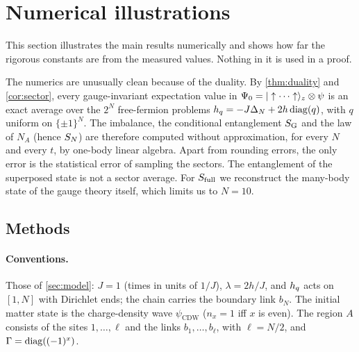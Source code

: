 \providecommand{\Ibar}{\bar I}
\providecommand{\Sfm}{S_{f}}
\providecommand{\Hsh}{\mathrm{H}}
\providecommand{\bent}{\mathsf{h}}
\providecommand{\Mom}{\mathcal{M}}
\providecommand{\Femp}{F_{\mathrm{emp}}}
\providecommand{\kaphat}{\hat\kappa}
\providecommand{\psicdw}{\psi_{\mathrm{CDW}}}

\section{Numerical illustrations}\label{sec:numerics}

This section illustrates the main results numerically and shows how far the rigorous constants are
from the measured values.  Nothing in it is used in a proof.

The numerics are unusually clean because of the duality.  By \cref{thm:duality} and \cref{cor:sector},
every gauge-invariant expectation value in $\Psi_0=|\uparrow\cdots\uparrow\rangle_z\otimes\psi$ is an exact
average over the $2^N$ free-fermion problems $h_{q}=-J\Delta_N+2h\operatorname{diag}(q)$, with $q$ uniform on $\{\pm1\}^N$.
The imbalance, the conditional entanglement $S_{\mathrm{G}}$ and the law of $N_A$ (hence $S_{N}$) are therefore computed without
approximation, for every $N$ and every $t$, by one-body linear algebra.  Apart from rounding errors, the only error is the
statistical error of sampling the sectors.  The entanglement of the superposed state is not a sector average.  For $S_{\mathrm{full}}$ we reconstruct the many-body state of the gauge
theory itself, which limits us to $N=10$.

\subsection{Methods}\label{sec:numerics:methods}

\paragraph{Conventions.}  Those of \cref{sec:model}: $J=1$ (times in units of $1/J$), $\lambda=2h/J$, and
$h_{q}$ acts on $[1,N]$ with Dirichlet ends; the chain carries the boundary link $b_N$.  The initial matter
state is the charge-density wave $\psicdw$ ($n_x=1$ iff $x$ is even).  The region $A$ consists of the sites
$1,\dots,\ell$ and the links $b_1,\dots,b_\ell$, with $\ell=N/2$, and $\Gamma=\operatorname{diag}((-1)^x)$.

